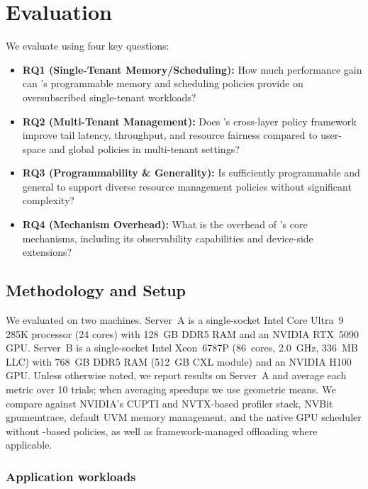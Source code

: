 \section{Evaluation}
\label{sec:eval}

We evaluate \sys using four key questions:

\begin{itemize}[leftmargin=*]
  \item \textbf{RQ1 (Single-Tenant Memory/Scheduling):} How much performance gain can \sys's programmable memory and scheduling policies provide on oversubscribed single-tenant workloads?
  \item \textbf{RQ2 (Multi-Tenant Management):} Does \sys's cross-layer policy framework improve tail latency, throughput, and resource fairness compared to user-space and global policies in multi-tenant settings?
  \item \textbf{RQ3 (Programmability \& Generality):} Is \sys sufficiently programmable and general to support diverse resource management policies without significant complexity?
  \item \textbf{RQ4 (Mechanism Overhead):} What is the overhead of \sys's core mechanisms, including its observability capabilities and device-side extensions?
\end{itemize}

\subsection{Methodology and Setup}

We evaluated \sys on two machines. Server~A is a single-socket Intel Core
Ultra~9 285K processor (24 cores) with 128~GB DDR5 RAM and an NVIDIA RTX~5090
GPU. Server~B is a single-socket Intel Xeon~6787P (86~cores, 2.0~GHz, 336~MB
LLC) with 768~GB DDR5 RAM (512~GB CXL module) and an NVIDIA H100 GPU. Unless
otherwise noted, we report results on Server~A and average each metric over
10 trials; when averaging speedups we use geometric means. We compare against
NVIDIA's CUPTI and NVTX-based profiler stack, NVBit gpumemtrace, default UVM
memory management, and the native GPU scheduler without \sys-based policies, as
well as framework-managed offloading where applicable.

\subsubsection{Application workloads}
\label{sec:eval-app-workloads}

